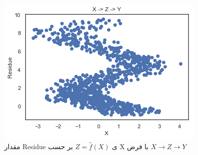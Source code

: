 \documentclass{article}
\begin{document}
\begin{itemize}
\begin{figure}[h]
\includegraphics[scale=0.455]{b2.png}
\caption{
مقدار  Residue ی
$Z = \hat{f}(X)$
بر حسب X با فرض 
$X \rightarrow Z \rightarrow Y$	
}
\label{back1}
\end{figure}



\end{itemize}
\end{document}
